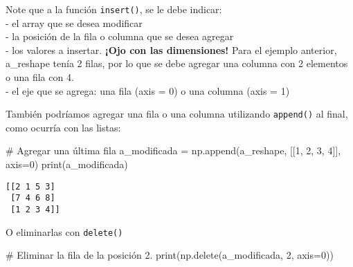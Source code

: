 \documentclass[
  letterpaper,
  DIV=11,
  numbers=noendperiod]{scrreprt}
\newenvironment{Shaded}{\begin{snugshade}}{\end{snugshade}}
\newcommand{\BuiltInTok}[1]{\textcolor[rgb]{0.00,0.23,0.31}{#1}}
\newcommand{\CommentTok}[1]{\textcolor[rgb]{0.37,0.37,0.37}{#1}}
\newcommand{\DecValTok}[1]{\textcolor[rgb]{0.68,0.00,0.00}{#1}}
\newcommand{\NormalTok}[1]{\textcolor[rgb]{0.00,0.23,0.31}{#1}}
\newcommand{\OperatorTok}[1]{\textcolor[rgb]{0.37,0.37,0.37}{#1}}
\begin{document}
\begin{tcolorbox}[enhanced jigsaw, opacityback=0, coltitle=black, toptitle=1mm, colframe=quarto-callout-note-color-frame, leftrule=.75mm, colback=white, opacitybacktitle=0.6, toprule=.15mm, breakable, bottomrule=.15mm, rightrule=.15mm, bottomtitle=1mm, titlerule=0mm, title=\textcolor{quarto-callout-note-color}{\faInfo}\hspace{0.5em}{\textbf{Observemos los parámetros}\\
}, colbacktitle=quarto-callout-note-color!10!white, left=2mm, arc=.35mm]

Note que a la función \texttt{insert()}, se le debe indicar:\\
- el array que se desea modificar\\
- la posición de la fila o columna que se desea agregar\\
- los valores a insertar. \textbf{¡Ojo con las dimensiones!} Para el
ejemplo anterior, a\_reshape tenía 2 filas, por lo que se debe agregar
una columna con 2 elementos o una fila con 4.\\
- el eje que se agrega: una fila (axis = 0) o una columna (axis = 1)\\

\end{tcolorbox}

También podríamos agregar una fila o una columna utilizando
\texttt{append()} al final, como ocurría con las listas:

\begin{Shaded}
\begin{Highlighting}[]
\CommentTok{\# Agregar una última fila}
\NormalTok{a\_modificada }\OperatorTok{=}\NormalTok{ np.append(a\_reshape, [[}\DecValTok{1}\NormalTok{, }\DecValTok{2}\NormalTok{, }\DecValTok{3}\NormalTok{, }\DecValTok{4}\NormalTok{]], axis}\OperatorTok{=}\DecValTok{0}\NormalTok{)}
\BuiltInTok{print}\NormalTok{(a\_modificada)}
\end{Highlighting}
\end{Shaded}

\begin{verbatim}
[[2 1 5 3]
 [7 4 6 8]
 [1 2 3 4]]
\end{verbatim}

O eliminarlas con \texttt{delete()}

\begin{Shaded}
\begin{Highlighting}[]
\CommentTok{\# Eliminar la fila de la posición 2.}
\BuiltInTok{print}\NormalTok{(np.delete(a\_modificada, }\DecValTok{2}\NormalTok{, axis}\OperatorTok{=}\DecValTok{0}\NormalTok{))}
\end{Highlighting}
\end{Shaded}
\end{document}
